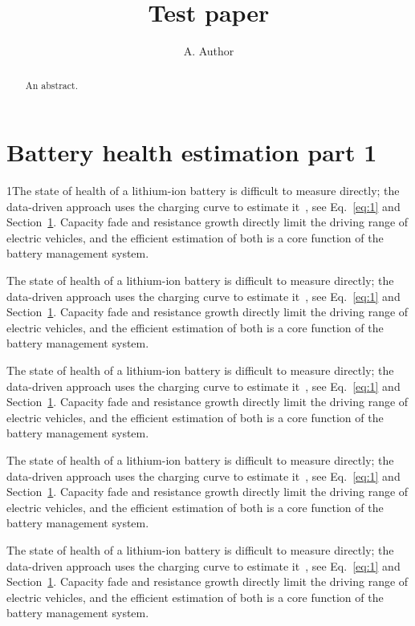 \documentclass[11pt]{article}
\title{Test paper}
\author{A. Author}
\begin{document}
\maketitle
\begin{abstract}An abstract.\end{abstract}
\section{Battery health estimation part 1}\label{sec:1}
1The state of health of a lithium-ion battery is difficult to measure directly; the data-driven approach uses the charging curve to estimate it~\cite{a2020}, see Eq.~\eqref{eq:1} and Section~\ref{sec:1}. Capacity fade and resistance growth directly limit the driving range of electric vehicles, and the efficient estimation of both is a core function of the battery management system.

The state of health of a lithium-ion battery is difficult to measure directly; the data-driven approach uses the charging curve to estimate it~\cite{a2020}, see Eq.~\eqref{eq:1} and Section~\ref{sec:1}. Capacity fade and resistance growth directly limit the driving range of electric vehicles, and the efficient estimation of both is a core function of the battery management system.

The state of health of a lithium-ion battery is difficult to measure directly; the data-driven approach uses the charging curve to estimate it~\cite{a2020}, see Eq.~\eqref{eq:1} and Section~\ref{sec:1}. Capacity fade and resistance growth directly limit the driving range of electric vehicles, and the efficient estimation of both is a core function of the battery management system.

The state of health of a lithium-ion battery is difficult to measure directly; the data-driven approach uses the charging curve to estimate it~\cite{a2020}, see Eq.~\eqref{eq:1} and Section~\ref{sec:1}. Capacity fade and resistance growth directly limit the driving range of electric vehicles, and the efficient estimation of both is a core function of the battery management system.

The state of health of a lithium-ion battery is difficult to measure directly; the data-driven approach uses the charging curve to estimate it~\cite{a2020}, see Eq.~\eqref{eq:1} and Section~\ref{sec:1}. Capacity fade and resistance growth directly limit the driving range of electric vehicles, and the efficient estimation of both is a core function of the battery management system.
\end{document}
